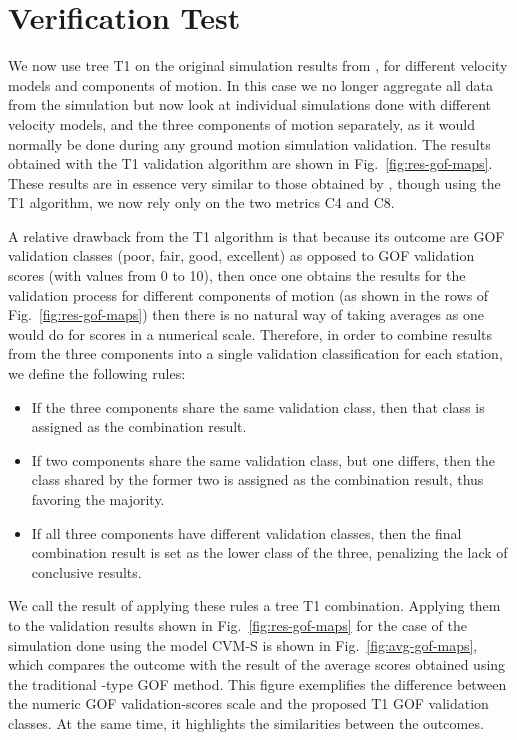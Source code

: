 
\section{Verification Test}

We now use tree T1 on the original simulation results from \citet{Taborda_2014_BSSA}, for different velocity models and components of motion. In this case we no longer aggregate all data from the simulation but now look at individual simulations done with different velocity models, and the three components of motion separately, as it would normally be done during any ground motion simulation validation. The results obtained with the T1 validation algorithm are shown in Fig.~\ref{fig:res-gof-maps}. These results are in essence very similar to those obtained by \citet{Taborda_2014_BSSA}, though using the T1 algorithm, we now rely only on the two metrics C4 and C8.

A relative drawback from the T1 algorithm is that because its outcome are GOF validation classes (poor, fair, good, excellent) as opposed to GOF validation scores (with values from 0 to 10), then once one obtains the results for the validation process for different components of motion (as shown in the rows of Fig.~\ref{fig:res-gof-maps}) then there is no natural way of taking averages as one would do for scores in a numerical scale. Therefore, in order to combine results from the three components into a single validation classification for each station, we define the following rules:

\begin{itemize}
	\setlength\itemsep{0ex}
	\item If the three components share the same validation class, then that class is assigned as the combination result.
	\item If two components share the same validation class, but one differs, then the class shared by the former two is assigned as the combination result, thus favoring the majority.
	\item If all three components have different validation classes, then the final combination result is set as the lower class of the three, penalizing the lack of conclusive results.
\end{itemize}

We call the result of applying these rules a tree T1 combination. Applying them to the validation results shown in Fig.~\ref{fig:res-gof-maps} for the case of the simulation done using the model CVM-S is shown in Fig.~\ref{fig:avg-gof-maps}, which compares the outcome with the result of the average scores obtained using the traditional \citet{Anderson_2004_Proc}-type GOF method. This figure exemplifies the difference between the numeric GOF validation-scores scale and the proposed T1 GOF validation classes. At the same time, it highlights the similarities between the outcomes.


